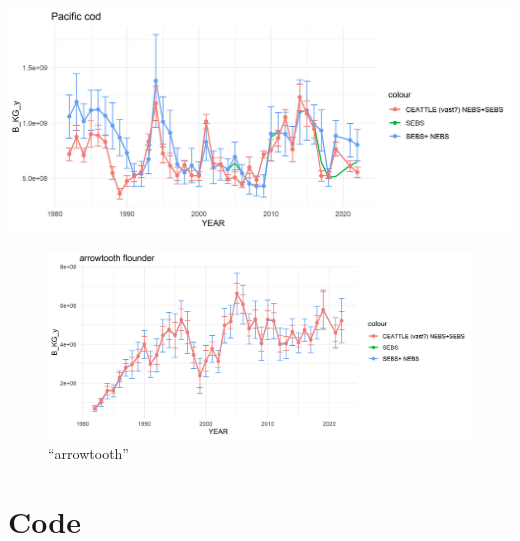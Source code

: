 \documentclass[
]{article}
\begin{document}
\includegraphics{figs/pcod_srvy.jpg}

\begin{figure}
\centering
\includegraphics{figs/atf_srvy.jpg}
\caption{``arrowtooth''}
\end{figure}

\hypertarget{code}{%
\section{Code}\label{code}}
\end{document}
